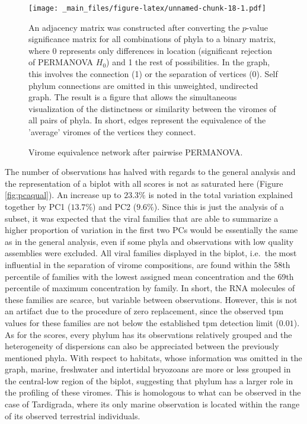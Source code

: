 \documentclass[
  openany]{book}
\begin{document}
\begin{figure}[!htbp]

\texttt{[image: \_main\_files/figure-latex/unnamed-chunk-18-1.pdf]}

\caption{Virome equivalence network after pairwise PERMANOVA.\label{fig:grafosqual}}

An adjacency matrix was constructed after converting the $p$-value significance matrix for all combinations of phyla to a binary matrix, where 0 represents only differences in location (significant rejection of PERMANOVA $H_0$) and 1 the rest of possibilities. In the graph, this involves the connection (1) or the separation of vertices (0). Self phylum connections are omitted in this unweighted, undirected graph. The result is a figure that allows the simultaneous visualization of the distinctness or similarity between the viromes of all pairs of phyla. In short, edges represent the equivalence of the 'average' viromes of the vertices they connect.

\end{figure}

The number of observations has halved with regards to the general analysis and the representation of a biplot with all scores is not as saturated here (Figure \ref{fig:pcaqual}). An increase up to \(23.3\%\) is noted in the total variation explained together by PC1 (\(13.7\%\)) and PC2 (\(9.6\%\)). Since this is just the analysis of a subset, it was expected that the viral families that are able to summarize a higher proportion of variation in the first two PCs would be essentially the same as in the general analysis, even if some phyla and observations with low quality assemblies were excluded. All viral families displayed in the biplot, i.e.~the most influential in the separation of virome compositions, are found within the 58th percentile of families with the lowest assigned mean concentration and the 69th percentile of maximum concentration by family. In short, the RNA molecules of these families are scarce, but variable between observations. However, this is not an artifact due to the procedure of zero replacement, since the observed tpm values for these families are not below the established tpm detection limit (\(0.01\)). As for the scores, every phylum has its observations relatively grouped and the heterogeneity of dispersions can also be appreciated between the previously mentioned phyla. With respect to habitats, whose information was omitted in the graph, marine, freshwater and intertidal bryozoans are more or less grouped in the central-low region of the biplot, suggesting that phylum has a larger role in the profiling of these viromes. This is homologous to what can be observed in the case of Tardigrada, where its only marine observation is located within the range of its observed terrestrial individuals.
\end{document}
